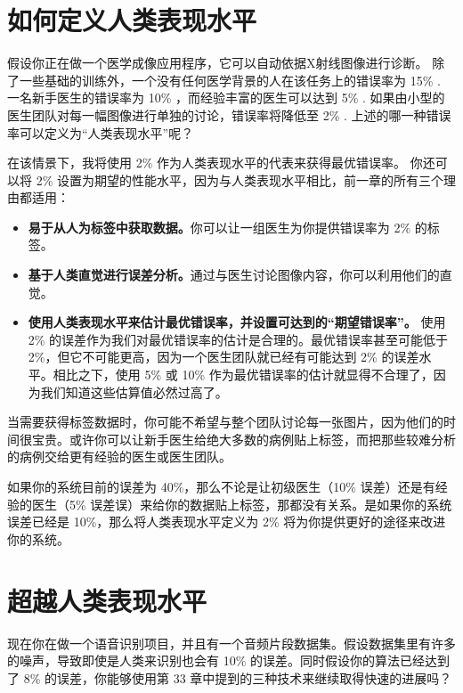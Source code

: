 \hypertarget{ux5982ux4f55ux5b9aux4e49ux4ebaux7c7bux8868ux73b0ux6c34ux5e73}{%
\chapter{如何定义人类表现水平}\label{ux5982ux4f55ux5b9aux4e49ux4ebaux7c7bux8868ux73b0ux6c34ux5e73}}

假设你正在做一个医学成像应用程序，它可以自动依据X射线图像进行诊断。
除了一些基础的训练外，一个没有任何医学背景的人在该任务上的错误率为 15\%
. 一名新手医生的错误率为 10\% ，而经验丰富的医生可以达到 5\% .
如果由小型的医生团队对每一幅图像进行单独的讨论，错误率将降低至 2\% .
上述的哪一种错误率可以定义为``人类表现水平''呢？

在该情景下，我将使用 2\% 作为人类表现水平的代表来获得最优错误率。
你还可以将 2\%
设置为期望的性能水平，因为与人类表现水平相比，前一章的所有三个理由都适用：

\begin{itemize}
\tightlist
\item
  \textbf{易于从人为标签中获取数据。}你可以让一组医生为你提供错误率为
  2\% 的标签。
\item
  \textbf{基于人类直觉进行误差分析。}通过与医生讨论图像内容，你可以利用他们的直觉。
\item
  \textbf{使用人类表现水平来估计最优错误率，并设置可达到的``期望错误率''。}
  使用 2\%
  的误差作为我们对最优错误率的估计是合理的。最优错误率甚至可能低于
  2\%，但它不可能更高，因为一个医生团队就已经有可能达到 2\%
  的误差水平。相比之下，使用 5\% 或 10\%
  作为最优错误率的估计就显得不合理了，因为我们知道这些估算值必然过高了。
\end{itemize}

当需要获得标签数据时，你可能不希望与整个团队讨论每一张图片，因为他们的时间很宝贵。或许你可以让新手医生给绝大多数的病例贴上标签，而把那些较难分析的病例交给更有经验的医生或医生团队。

如果你的系统目前的误差为 40\%，那么不论是让初级医生（10\%
误差）还是有经验的医生（5\%
误差误）来给你的数据贴上标签，那都没有关系。是如果你的系统误差已经是
10\%，那么将人类表现水平定义为 2\% 将为你提供更好的途径来改进你的系统。

\hypertarget{ux8d85ux8d8aux4ebaux7c7bux8868ux73b0ux6c34ux5e73}{%
\chapter{超越人类表现水平}\label{ux8d85ux8d8aux4ebaux7c7bux8868ux73b0ux6c34ux5e73}}

现在你在做一个语音识别项目，并且有一个音频片段数据集。假设数据集里有许多的噪声，导致即使是人类来识别也会有
10\% 的误差。同时假设你的算法已经达到了 8\% 的误差，你能够使用第 33
章中提到的三种技术来继续取得快速的进展吗？

